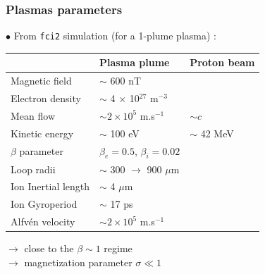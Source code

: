 \documentclass{beamer}
\begin{document}
\begin{frame}
\frametitle{Plasmas parameters}

$\bullet$ From \texttt{fci2} simulation (for a 1-plume plasma) :

\begin{center}
\begin{tabular}{lll}
\hline
\hline
& Plasma plume & Proton beam \hspace{2.0cm}\\
\hline
Magnetic field             & $\sim$ 600 nT                              & \\
Electron density           & $\sim$ 4 $\times$ 10$^{27}$ m$^{-3}$       & \\
Mean flow                  & $\sim 2 \times 10^5$ m.s$^{-1}$            & $\sim c$ \\
Kinetic energy             & $\sim$ 100 eV                              & $\sim$ 42 MeV \\
$\beta$ parameter          & $\beta_e = 0.5$, $\beta_i = 0.02$          & \\
Loop radii                 & $\sim$ 300 $\to$ 900 $\mu$m                & \\
Ion Inertial length        & $\sim$ 4 $\mu$m                            & \\
Ion Gyroperiod             & $\sim$ 17 ps                               & \\
Alfvén velocity            & $\sim 2 \times 10^5$ m.s$^{-1}$            & \\
\hline
\hline
\end{tabular}
\end{center}

$\to$ close to the $\beta \sim 1$ regime \\
$\to$ magnetization parameter $\sigma \ll 1$ \\

\end{frame}



\end{document}
